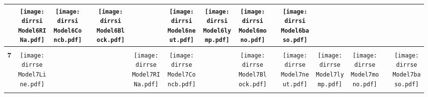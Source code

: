 \documentclass[landscape]{article}
\def \dirrsi{U:/R/RA/Data/RFI-newdata/resultsingle/Model6.Line.Concb.RINb.RINa.neut.lymp.mono.baso.Block/}
\def \dirrse{U:/R/RA/Data/RFI-newdata/resultsingle/Model7.Line.Concb.RINa.neut.lymp.mono.baso.Block/}
\begin{document}
\begin{table}
\begin{tabular}{ccccccccccccccc}
      &\texttt{[image: \\dirrsi Model6RINa.pdf]}
      &\texttt{[image: \\dirrsi Model6Concb.pdf]}
      &
      &\texttt{[image: \\dirrsi Model6Block.pdf]}
      &
      &\texttt{[image: \\dirrsi Model6neut.pdf]}
      &\texttt{[image: \\dirrsi Model6lymp.pdf]}
      &\texttt{[image: \\dirrsi Model6mono.pdf]}
      &
      &\texttt{[image: \\dirrsi Model6baso.pdf]}
     \\[3.5pt]
     \hline
     \\[3.5pt]
     {\Huge \textbf{7}} 
      &\texttt{[image: \\dirrse Model7Line.pdf]}
      &
      &
      &
      &\texttt{[image: \\dirrse Model7RINa.pdf]}
      &\texttt{[image: \\dirrse Model7Concb.pdf]}
      &
      &\texttt{[image: \\dirrse Model7Block.pdf]}
      &
      &\texttt{[image: \\dirrse Model7neut.pdf]}
      &\texttt{[image: \\dirrse Model7lymp.pdf]}
      &\texttt{[image: \\dirrse Model7mono.pdf]}
      &
      &\texttt{[image: \\dirrse Model7baso.pdf]}
     \\[3.5pt]
     \hline
     \\[3.5pt]

\end{tabular}
\end{table}
\end{document}
